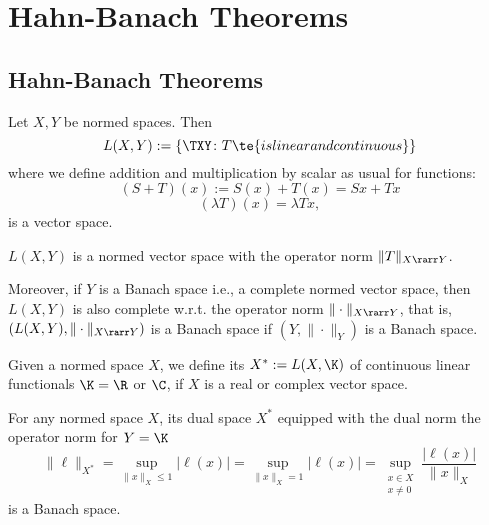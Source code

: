 \section{Hahn-Banach Theorems}
\subsection{Hahn-Banach Theorems}

\begin{definition}\label{iii.1}
    Let $X,Y$ be normed spaces. Then 
    \[L(X,Y):=\{\TXY\colon T\te{ is linear and continuous}\}\]
    where we define addition and multiplication by scalar as usual for functions:
    \[(S+T)(x):=S(x)+T(x)=Sx+Tx\]
    \[(\lambda T)(x)=\lambda Tx,\]
    is a vector space.
\end{definition}

\begin{prop}\label{iii.2}
    $L(X,Y)$ is a normed vector space with the operator norm $\|T\|_{X\rarr Y}$. 
    
    Moreover, if $Y$ is a Banach space \rec{(}i.e., a complete normed vector space\rec{)}, then $L(X,Y)$ is also complete w.r.t. the operator norm $\|\cdot\|_{X\rarr Y}$, that is, $(L(X,Y),\|\cdot\|_{X\rarr Y})$ is a Banach space if $(Y,\|\cdot\|_Y)$ is a Banach space.
\end{prop}

\begin{definition}\label{iii.3}
    Given a normed space $X$, we define its  $X^*:=L(X,\K)$ of continuous linear functionals
    \rec{(}$\K=\R$ or $\C$, if $X$ is a real or complex vector space\rec{)}.
\end{definition}

\begin{cor}\label{iii.4}
    For any normed space $X$, its dual space $X^*$ equipped with the dual norm \rec{(}the operator norm for $Y=\K$\rec{)}
    \[\|\ell\|_{X^*}=\sup_{\|x\|_X\leq 1}|\ell(x)|=\sup_{\|x\|_X=1}|\ell(x)|=\sup_{\substack{x\in X\\x\neq0}}\frac{|\ell(x)|}{\|x\|_X}\]
    is a Banach space.
\end{cor}